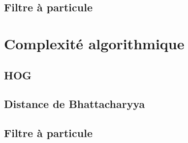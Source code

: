 \subsection{Filtre à particule}

\section{Complexité algorithmique}

\subsection{HOG}

\subsection{Distance de Bhattacharyya}

\subsection{Filtre à particule}

\clearpage